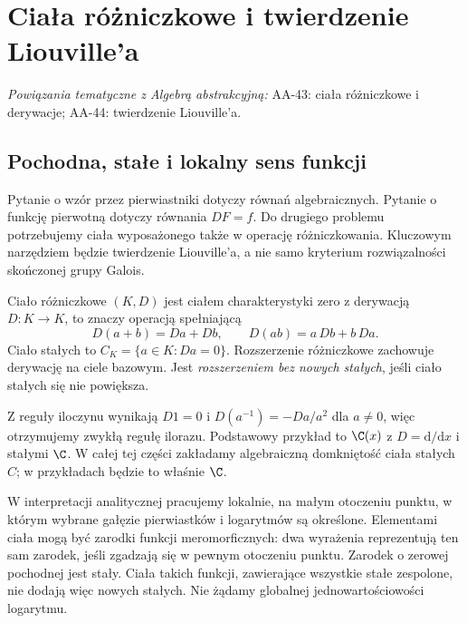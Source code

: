 \chapter{Ciała różniczkowe i twierdzenie Liouville'a}

\providecommand{\atlasref}[2]{#2}
\noindent\emph{Powiązania tematyczne z Algebrą abstrakcyjną:} \atlasref{AA-43::aa:ch:differential-fields}{AA-43: ciała różniczkowe i derywacje}; \atlasref{AA-44::aa:ch:liouville-elementary-integration}{AA-44: twierdzenie Liouville'a}.


\section{Pochodna, stałe i lokalny sens funkcji}

Pytanie o wzór przez pierwiastniki dotyczy równań algebraicznych. Pytanie o funkcję pierwotną dotyczy równania $DF=f$. Do drugiego problemu potrzebujemy ciała wyposażonego także w operację różniczkowania. Kluczowym narzędziem będzie twierdzenie Liouville'a, a nie samo kryterium rozwiązalności skończonej grupy Galois.

\begin{definicja}
Ciało różniczkowe $(K,D)$ jest ciałem charakterystyki zero z derywacją $D:K\to K$, to znaczy operacją spełniającą
\[
D(a+b)=Da+Db,\qquad D(ab)=a\,Db+b\,Da.
\]
Ciało stałych to $C_K=\{a\in K:Da=0\}$. Rozszerzenie różniczkowe zachowuje derywację na ciele bazowym. Jest \emph{rozszerzeniem bez nowych stałych}, jeśli ciało stałych się nie powiększa.
\end{definicja}

Z reguły iloczynu wynikają $D1=0$ i $D(a^{-1})=-Da/a^2$ dla $a\ne0$, więc otrzymujemy zwykłą regułę ilorazu. Podstawowy przykład to $\C(x)$ z $D=\mathrm{d}/\mathrm{d}x$ i stałymi $\C$. W całej tej części zakładamy algebraiczną domkniętość ciała stałych $C$; w przykładach będzie to właśnie $\C$.

W interpretacji analitycznej pracujemy lokalnie, na małym otoczeniu punktu, w którym wybrane gałęzie pierwiastków i logarytmów są określone. Elementami ciała mogą być zarodki funkcji meromorficznych: dwa wyrażenia reprezentują ten sam zarodek, jeśli zgadzają się w pewnym otoczeniu punktu. Zarodek o zerowej pochodnej jest stały. Ciała takich funkcji, zawierające wszystkie stałe zespolone, nie dodają więc nowych stałych. Nie żądamy globalnej jednowartościowości logarytmu.


